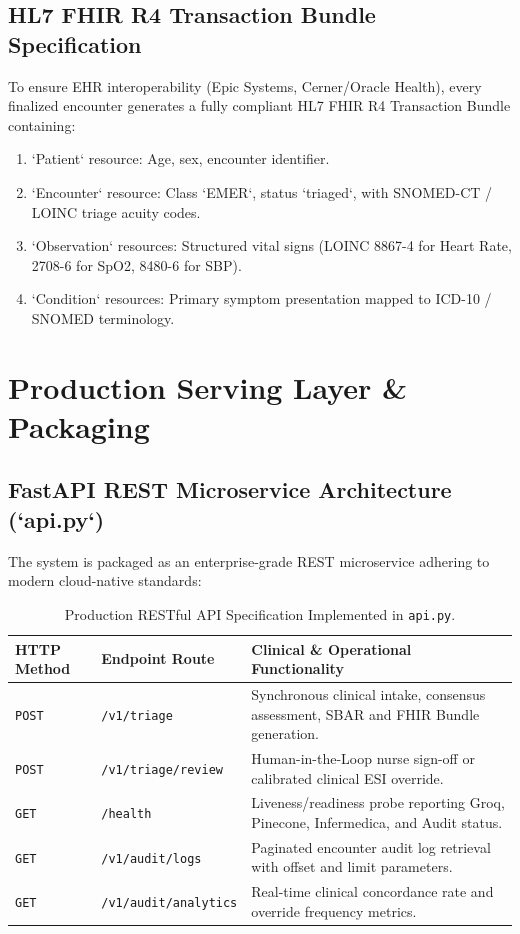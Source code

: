 \documentclass[11pt,a4paper]{article}
\begin{document}
\subsection{HL7 FHIR R4 Transaction Bundle Specification}
To ensure EHR interoperability (Epic Systems, Cerner/Oracle Health), every finalized encounter generates a fully compliant HL7 FHIR R4 Transaction Bundle containing:
\begin{enumerate}[leftmargin=1.5em]
    \item `Patient` resource: Age, sex, encounter identifier.
    \item `Encounter` resource: Class `EMER`, status `triaged`, with SNOMED-CT / LOINC triage acuity codes.
    \item `Observation` resources: Structured vital signs (LOINC 8867-4 for Heart Rate, 2708-6 for SpO2, 8480-6 for SBP).
    \item `Condition` resources: Primary symptom presentation mapped to ICD-10 / SNOMED terminology.
\end{enumerate}

\section{Production Serving Layer \& Packaging}

\subsection{FastAPI REST Microservice Architecture (`api.py`)}
The system is packaged as an enterprise-grade REST microservice adhering to modern cloud-native standards:

\begin{table}[htbp]
\centering
\small
\begin{tabularx}{\textwidth}{l l X}
\toprule
\textbf{HTTP Method} & \textbf{Endpoint Route} & \textbf{Clinical \& Operational Functionality} \\
\midrule
\texttt{POST} & \texttt{/v1/triage} & Synchronous clinical intake, consensus assessment, SBAR and FHIR Bundle generation. \\
\texttt{POST} & \texttt{/v1/triage/review} & Human-in-the-Loop nurse sign-off or calibrated clinical ESI override. \\
\texttt{GET} & \texttt{/health} & Liveness/readiness probe reporting Groq, Pinecone, Infermedica, and Audit status. \\
\texttt{GET} & \texttt{/v1/audit/logs} & Paginated encounter audit log retrieval with offset and limit parameters. \\
\texttt{GET} & \texttt{/v1/audit/analytics} & Real-time clinical concordance rate and override frequency metrics. \\
\bottomrule
\end{tabularx}
\caption{Production RESTful API Specification Implemented in \texttt{api.py}.}
\label{tab:api_endpoints}
\end{table}
\end{document}
